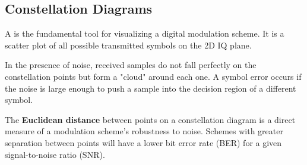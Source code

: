 \subsection{Constellation Diagrams}

A  is the fundamental tool for visualizing a digital modulation scheme. It is a scatter plot of all possible transmitted symbols on the 2D IQ plane.

\begin{centre}
\end{centre}

In the presence of noise, received samples do not fall perfectly on the constellation points but form a "cloud" around each one. A symbol error occurs if the noise is large enough to push a sample into the decision region of a different symbol.

\begin{keyconcept}
    The \textbf{Euclidean distance} between points on a constellation diagram is a direct measure of a modulation scheme's robustness to noise. Schemes with greater separation between points will have a lower bit error rate (BER) for a given signal-to-noise ratio (SNR).
\end{keyconcept}

